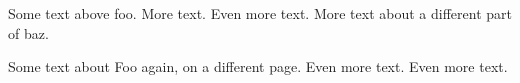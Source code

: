 \documentclass{article}
\begin{document}
	Some text above foo.
	More text.
	Even more text.
	More text about a different part of baz.
	
	\clearpage
	Some text about Foo again, on a different page.
	Even more text.
	Even more text.
	
	\printindex
\end{document}
